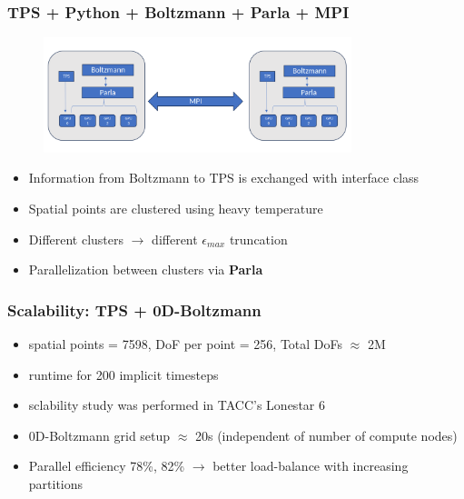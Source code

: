 \documentclass[mathserif, aspectratio=169]{beamer}
\begin{document}
\begin{frame}
	\frametitle{TPS + Python + Boltzmann + Parla + MPI}
	\begin{figure}
		\centering
		\includegraphics[width=0.8\textwidth]{software_integration.png}
	\end{figure}
	\begin{itemize}
		\item Information from Boltzmann to TPS is exchanged with interface class
		\item Spatial points are clustered using heavy temperature
		\item Different clusters $\rightarrow$ different $\epsilon_{max}$ truncation
		\item Parallelization between clusters via \textbf{Parla}
	\end{itemize}
\end{frame}

\begin{frame}[fragile]
	\frametitle{Scalability: TPS + 0D-Boltzmann}
	\begin{itemize}
		\item spatial points = 7598, DoF per point = 256, Total DoFs $\approx$ 2M
		\item runtime for 200 implicit timesteps
		\item sclability study was performed in TACC's Lonestar 6 %
	\end{itemize}
	\begin{figure}
		\centering
	\end{figure}
	\begin{itemize}
		\item 0D-Boltzmann grid setup $\approx$ 20s (independent of number of compute nodes)
		\item Parallel efficiency 78\%, 82\% $\rightarrow$ better load-balance with increasing partitions
	\end{itemize}
\end{frame}
\end{document}

